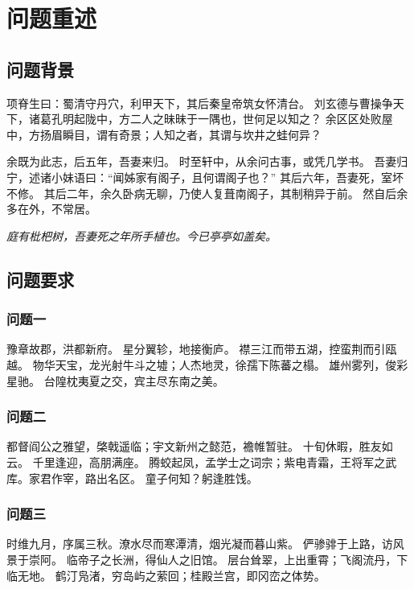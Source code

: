 \section{问题重述}

\subsection{问题背景}

项脊生曰：蜀清守丹穴，利甲天下，其后秦皇帝筑女怀清台。
刘玄德与曹操争天下，诸葛孔明起陇中，方二人之昧昧于一隅也，世何足以知之？
余区区处败屋中，方扬眉瞬目，谓有奇景；人知之者，其谓与坎井之蛙何异？ 

余既为此志，后五年，吾妻来归。
时至轩中，从余问古事，或凭几学书。
吾妻归宁，述诸小妹语曰：“闻姊家有阁子，且何谓阁子也？”
其后六年，吾妻死，室坏不修。
其后二年，余久卧病无聊，乃使人复葺南阁子，其制稍异于前。
然自后余多在外，不常居。

\textit{庭有枇杷树，吾妻死之年所手植也。今已亭亭如盖矣。 }

\subsection{问题要求}

\subsubsection{问题一}

豫章故郡，洪都新府。
星分翼轸，地接衡庐。
襟三江而带五湖，控蛮荆而引瓯越。
物华天宝，龙光射牛斗之墟；人杰地灵，徐孺下陈蕃之榻。
雄州雾列，俊彩星驰。
台隍枕夷夏之交，宾主尽东南之美。

\subsubsection{问题二}

都督阎公之雅望，棨戟遥临；宇文新州之懿范，襜帷暂驻。
十旬休暇，胜友如云。
千里逢迎，高朋满座。
腾蛟起凤，孟学士之词宗；紫电青霜，王将军之武库。家君作宰，路出名区。
童子何知？躬逢胜饯。 

\subsubsection{问题三}

时维九月，序属三秋。潦水尽而寒潭清，烟光凝而暮山紫。
俨骖𬴂于上路，访风景于崇阿。
临帝子之长洲，得仙人之旧馆。
层台耸翠，上出重霄；飞阁流丹，下临无地。
鹤汀凫渚，穷岛屿之萦回；桂殿兰宫，即冈峦之体势。 


